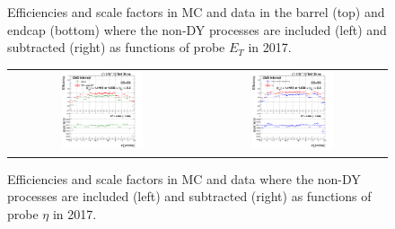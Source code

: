 \begin{figure}[htp]
\begin{center}
\begin{tabular}{cc}
    \end{tabular}
    \caption{Efficiencies and scale factors in MC and data in the barrel (top) and endcap (bottom) where the non-DY processes are included (left) and subtracted (right) as functions of probe $E_T$ in 2017.}
    \label{fig:eff_SS_nominal_ET_2017}
  \end{center}
\end{figure}

\begin{figure}[htp]
  \begin{center}
    \begin{tabular}{cc}
      \includegraphics[width=0.45\textwidth]{figures/Zprime/2017/ScaleFactor/SameSign/nominal/g_compare_cut_eta_Barrel+Endcap_ea_ta_inc_AS_nominal_PUW.png} &
      \includegraphics[width=0.45\textwidth]{figures/Zprime/2017/ScaleFactor/SameSign/nominal/g_compare_cut_eta_Barrel+Endcap_ea_ta_exc_AS_nominal_PUW.png} \\
    \end{tabular}
    \caption{Efficiencies and scale factors in MC and data where the non-DY processes are included (left) and subtracted (right) as functions of probe $\eta$ in 2017.}
    \label{fig:eff_SS_nominal_eta_2017}
  \end{center}
\end{figure}

